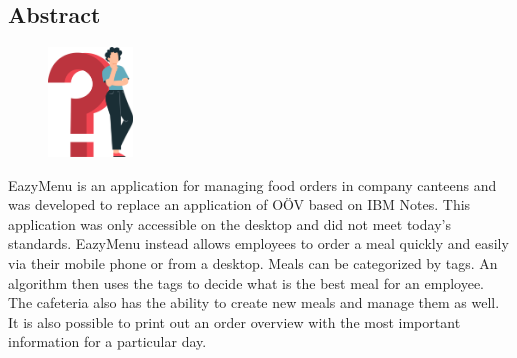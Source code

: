 \begin{spacing}{1}
    \chapter*{Abstract}
\end{spacing}
\begin{figure}
    \begin{center}
      \includegraphics[width=0.2\textwidth]{pics/question_mark.png}
    \end{center}
\end{figure}
EazyMenu is an application for managing food orders in company canteens and was developed to replace an application of OÖV based on IBM Notes. 
This application was only accessible on the desktop and did not meet today's standards. 
EazyMenu instead allows employees to order a meal quickly and easily via their mobile phone or from a desktop. 
Meals can be categorized by tags. An algorithm then uses the tags to decide what is the best meal for an employee.
The cafeteria also has the ability to create new meals and manage them as well. 
It is also possible to print out an order overview with the most important information for a particular day.


\newpage

